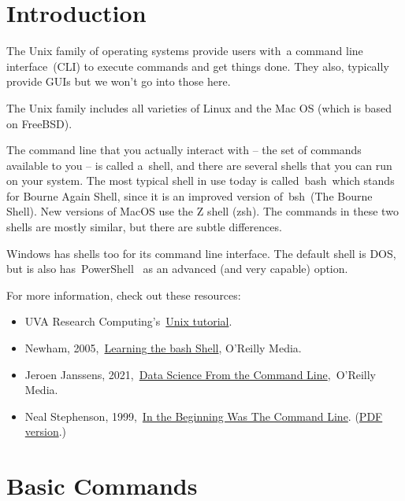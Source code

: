 \documentclass[
  letterpaper,
  DIV=11,
  numbers=noendperiod]{scrreport}
\providecommand{\tightlist}{%
  \setlength{\itemsep}{0pt}\setlength{\parskip}{0pt}}\usepackage{longtable,booktabs,array}
\begin{document}
\hypertarget{introduction-1}{%
\section{Introduction}\label{introduction-1}}

The Unix family of operating systems provide users with~a command line
interface~(CLI) to execute commands and get things done. They also,
typically provide GUIs but we won't go into those here.

The Unix family includes all varieties of Linux and the Mac OS (which is
based on FreeBSD).

The command line that you actually interact with -- the set of commands
available to you -- is called a~shell, and there are several shells that
you can run on your system. The most typical shell in use today is
called~bash~which stands for Bourne Again Shell, since it is an improved
version of~bsh~(The Bourne Shell). New versions of MacOS use the Z shell
(zsh). The commands in these two shells are mostly similar, but there
are subtle differences.

Windows has shells too for its command line interface. The default shell
is DOS, but is also has~PowerShell~ as an advanced (and very capable)
option.

For more information, check out these resources:

\begin{itemize}
\tightlist
\item
  UVA Research
  Computing's~\href{https://learning.rc.virginia.edu/notes/unix-tutorial/}{Unix
  tutorial}.
\item
  Newham,
  2005,~\href{https://learning.oreilly.com/library/view/learning-the-bash/0596009658/}{Learning
  the bash Shell}, O'Reilly Media.
\item
  Jeroen Janssens,
  2021,~\href{https://datascienceatthecommandline.com/2e/}{Data Science
  From the Command Line},~O'Reilly Media.
\item
  Neal Stephenson,
  1999,~\href{http://project.cyberpunk.ru/lib/in_the_beginning_was_the_command_line/}{In
  the Beginning Was The Command Line}.
  (\href{http://public-library.uk/ebooks/23/31.pdf}{PDF version}.)
\end{itemize}

\hypertarget{basic-commands}{%
\section{Basic Commands}\label{basic-commands}}
\end{document}
